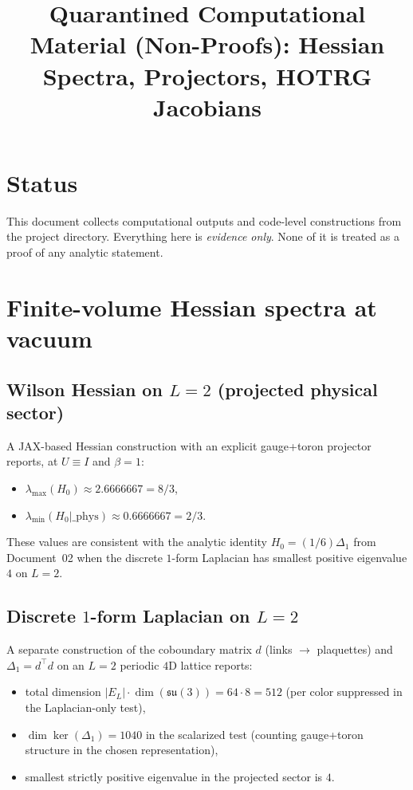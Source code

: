 \documentclass[11pt]{article}
\title{Quarantined Computational Material (Non-Proofs): Hessian Spectra, Projectors, HOTRG Jacobians}
\date{}
\begin{document}
\maketitle

\section{Status}

This document collects computational outputs and code-level constructions from the project directory.
Everything here is \emph{evidence only}.  None of it is treated as a proof of any analytic statement.

\section{Finite-volume Hessian spectra at vacuum}

\subsection{Wilson Hessian on $L=2$ (projected physical sector)}

A JAX-based Hessian construction with an explicit gauge+toron projector reports, at $U\equiv I$ and $\beta=1$:
\begin{itemize}[leftmargin=*]
\item $\lambda_{\max}(H_0)\approx 2.6666667=8/3$,
\item $\lambda_{\min}(H_0|\_{\mathrm{phys}})\approx 0.6666667=2/3$.
\end{itemize}

These values are consistent with the analytic identity $H_0=(1/6)\Delta_1$ from Document~02 when the discrete $1$-form Laplacian has smallest positive eigenvalue $4$ on $L=2$.

\subsection{Discrete $1$-form Laplacian on $L=2$}

A separate construction of the coboundary matrix $d$ (links $\to$ plaquettes) and $\Delta_1=d^\top d$ on an $L=2$ periodic $4$D lattice reports:
\begin{itemize}[leftmargin=*]
\item total dimension $|E_L|\cdot \dim(\mathfrak{su}(3)) = 64\cdot 8 = 512$ (per color suppressed in the Laplacian-only test),
\item $\dim\ker(\Delta_1)=1040$ in the scalarized test (counting gauge+toron structure in the chosen representation),
\item smallest strictly positive eigenvalue in the projected sector is $4$.
\end{itemize}
\end{document}
